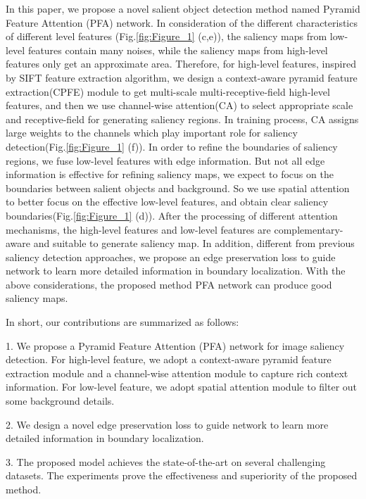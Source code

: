 \documentclass[10pt,twocolumn,letterpaper]{article}
\begin{document}
In this paper, we propose a novel salient object detection method named Pyramid Feature Attention (PFA) network. In consideration of the different characteristics of different level features (Fig.\ref{fig:Figure_1} (c,e)), the saliency maps from low-level features contain many noises, while the saliency maps from high-level features only get an approximate area. Therefore, for high-level features, inspired by SIFT\cite{sift} feature extraction algorithm, we design a context-aware pyramid feature extraction(CPFE) module to get multi-scale multi-receptive-field high-level features, and then we use channel-wise attention(CA) to select appropriate scale and receptive-field for generating saliency regions. In training process, CA assigns large weights to the channels which play important role for saliency detection(Fig.\ref{fig:Figure_1} (f)). In order to refine the boundaries of saliency regions, we fuse low-level features with edge information. But not all edge information is effective for refining saliency maps, we expect to focus on the boundaries between salient objects and background. So we use spatial attention to better focus on the effective low-level features, and obtain clear saliency boundaries(Fig.\ref{fig:Figure_1} (d)). After the processing of different attention mechanisms, the high-level features and low-level features are complementary-aware and suitable to generate saliency map.  In addition, different from previous saliency detection approaches, we propose an edge preservation loss to guide network to learn more detailed information in boundary localization. With the above considerations, the proposed method PFA network can produce good saliency maps.

In short, our contributions are summarized as follows: 

1. We propose a Pyramid Feature Attention (PFA) network for image saliency detection. For high-level feature, we adopt a context-aware pyramid feature extraction module and a channel-wise attention module to capture rich context information. For low-level feature, we adopt spatial attention module to filter out some background details. 

2. We design a novel edge preservation loss to guide network to learn more detailed information in boundary localization. 

3. The proposed model achieves the state-of-the-art on several challenging datasets. The experiments prove the effectiveness and superiority of the proposed method.
\end{document}
